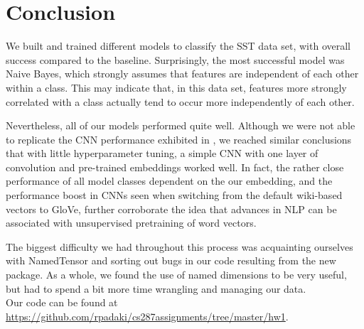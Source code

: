 \documentclass[11pt]{article}
\begin{document}


\section{Conclusion}

We built and trained different models to classify the SST data set, with overall success compared to the baseline. Surprisingly, the most successful model was Naive Bayes, which strongly assumes that features are independent of each other within a class. This may indicate that, in this data set, features more strongly correlated with a class actually tend to occur more independently of each other.

Nevertheless, all of our models performed quite well. Although we were not able to replicate the CNN performance exhibited in \citet{DBLP:journals/corr/Kim14f}, we reached similar conclusions that with little hyperparameter tuning, a simple CNN with one layer of convolution and pre-trained embeddings worked well. In fact, the rather close performance of all model classes dependent on the our embedding, and the performance boost in CNNs seen when switching from the default wiki-based vectors to GloVe, further corroborate the idea that advances in NLP can be associated with unsupervised pretraining of word vectors. 


The biggest difficulty we had throughout this process was acquainting ourselves with NamedTensor and sorting out bugs in our code resulting from the new package.  As a whole, we found the use of named dimensions to be very useful, but had to spend a bit more time wrangling and managing our data.\\

Our code can be found at \url{https://github.com/rpadaki/cs287assignments/tree/master/hw1}.



\end{document}
